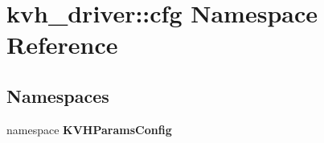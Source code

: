 \section{kvh\-\_\-driver\-:\-:cfg \-Namespace \-Reference}
\label{namespacekvh__driver_1_1cfg}
\subsection*{\-Namespaces}
\begin{DoxyCompactItemize}
\item 
namespace {\bf \-K\-V\-H\-Params\-Config}
\end{DoxyCompactItemize}
